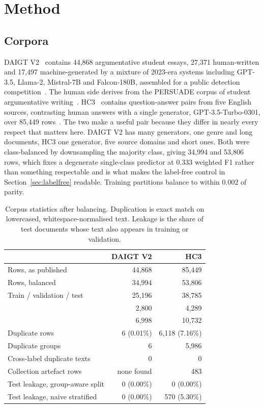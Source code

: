 \section{Method}
\label{sec:method}

\subsection{Corpora}

DAIGT V2~\cite{Thedrcat2023daigtv2} contains 44,868 argumentative student essays, 27,371 human-written and 17,497 machine-generated by a mixture of 2023-era systems including GPT-3.5, Llama-2, Mistral-7B and Falcon-180B, assembled for a public detection competition~\cite{Kaggle2023llmdetect}. The human side derives from the PERSUADE corpus of student argumentative writing~\cite{Crossley2023persuade}. HC3~\cite{Guo2023close} contains question-answer pairs from five English sources, contrasting human answers with a single generator, GPT-3.5-Turbo-0301, over 85,449 rows~\cite{HelloSimpleAI2023hc3}. The two make a useful pair because they differ in nearly every respect that matters here. DAIGT V2 has many generators, one genre and long documents, HC3 one generator, five source domains and short ones. Both were class-balanced by downsampling the majority class, giving 34,994 and 53,806 rows, which fixes a degenerate single-class predictor at 0.333 weighted F1 rather than something respectable and is what makes the label-free control in Section~\ref{sec:labelfree} readable. Training partitions balance to within 0.002 of parity.

\begin{table}[!ht]
\centering
\caption{Corpus statistics after balancing. Duplication is exact match on lowercased, whitespace-normalised text. Leakage is the share of test documents whose text also appears in training or validation.}
\label{tab:corpora}
\footnotesize
\setlength{\tabcolsep}{3.5pt}
\begin{tabular}{@{}lrr@{}}
\toprule
& DAIGT V2 & HC3 \\
\midrule
Rows, as published & 44,868 & 85,449 \\
Rows, balanced & 34,994 & 53,806 \\
Train / validation / test & 25,196 & 38,785 \\
& 2,800 & 4,289 \\
& 6,998 & 10,732 \\
\midrule
Duplicate rows & 6 (0.01\%) & 6,118 (7.16\%) \\
Duplicate groups & 6 & 5,986 \\
Cross-label duplicate texts & 0 & 0 \\
Collection artefact rows & none found & 483 \\
\midrule
Test leakage, group-aware split & 0 (0.00\%) & 0 (0.00\%) \\
Test leakage, naive stratified & 0 (0.00\%) & 570 (5.30\%) \\
\bottomrule
\end{tabular}
\end{table}

